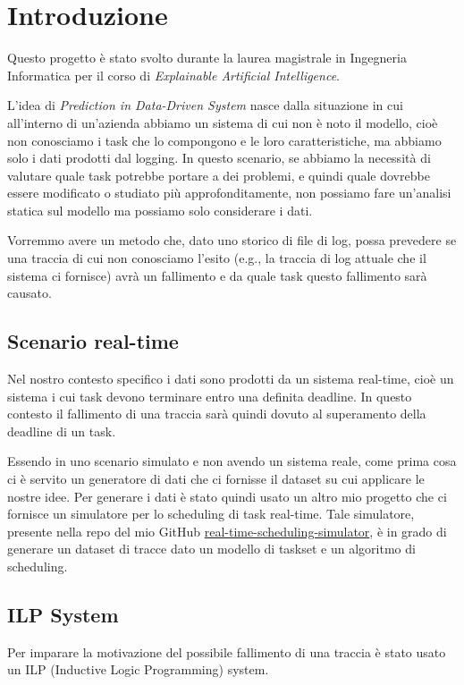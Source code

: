 \chapter{Introduzione}
Questo progetto è stato svolto durante la laurea magistrale in Ingegneria Informatica per il corso di \textit{Explainable Artificial Intelligence}.

L'idea di \textit{Prediction in Data-Driven System} nasce dalla situazione in cui all'interno di un'azienda abbiamo un sistema di cui non è noto il modello, cioè non conosciamo i task che lo compongono e le loro caratteristiche, ma abbiamo solo i dati prodotti dal logging. In questo scenario, se abbiamo la necessità di valutare quale task potrebbe portare a dei problemi, e quindi quale dovrebbe essere modificato o studiato più approfonditamente, non possiamo fare un'analisi statica sul modello ma possiamo solo considerare i dati.

Vorremmo avere un metodo che, dato uno storico di file di log, possa prevedere se una traccia di cui non conosciamo l'esito (e.g., la traccia di log attuale che il sistema ci fornisce) avrà un fallimento e da quale task questo fallimento sarà causato.

\section{Scenario real-time}
Nel nostro contesto specifico i dati sono prodotti da un sistema real-time, cioè un sistema i cui task devono terminare entro una definita deadline. In questo contesto il fallimento di una traccia sarà quindi dovuto al superamento della deadline di un task.

Essendo in uno scenario simulato e non avendo un sistema reale, come prima cosa ci è servito un generatore di dati che ci fornisse il dataset su cui applicare le nostre idee. Per generare i dati è stato quindi usato un altro mio progetto che ci fornisce un simulatore per lo scheduling di task real-time. Tale simulatore, presente nella repo del mio GitHub \href{https://github.com/edoardosarri24/real-time-scheduling-simulator}{real-time-scheduling-simulator}, è in grado di generare un dataset di tracce dato un modello di taskset e un algoritmo di scheduling.

\section{ILP System}
\label{sec:numsynth}
Per imparare la motivazione del possibile fallimento di una traccia è stato usato un ILP (Inductive Logic Programming) system.

